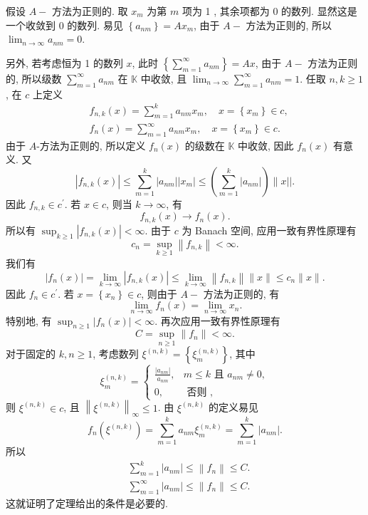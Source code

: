 \documentclass[openany]{ctexbook}
\makeatletter
\theoremstyle{kaiti}
\theoremstyle{normal}
\renewenvironment{proof}[1][\proofname]{\par
    \pushQED{\qed}%
    \normalfont \topsep6\p@\@plus6\p@\relax
    \trivlist
    \item\relax
    {\heiti #1}\hspace{2\labelsep}\ignorespaces
  }{%
    \popQED\endtrivlist\@endpefalse
  }
\makeatother
\begin{document}
\begin{proof}
假设 $A-$ 方法为正则的. 取 $x_m$ 为第 $m$ 项为 1 , 其余项都为 0 的数列. 显然这是一个收敛到 0 的数列. 易见 $\left\{a_{n m}\right\}=A x_m$, 由于 $A-$ 方法为正则的, 所以 $\lim_{n \rightarrow \infty} a_{n m}=0$.

另外, 若考虑恒为 1 的数列 $x$, 此时 $\left\{\sum_{m=1}^{\infty} a_{n m}\right\}=A x$, 由于 $A-$ 方法为正则的, 所以级数 $\sum_{m=1}^{\infty} a_{n m}$ 在 $\mathbb{K}$ 中收敛, 且 $\lim_{n \rightarrow \infty} \sum_{m=1}^{\infty} a_{n m}=1$.
任取 $n, k \geqslant 1$, 在 $c$ 上定义
$$
\begin{aligned}
&f_{n, k}(x)=\sum_{m=1}^{k} a_{n m} x_m, \quad x=\left\{x_m\right\} \in c, \\
&f_n(x)=\sum_{m=1}^{\infty} a_{n m} x_m, \quad x=\left\{x_m\right\} \in c.
\end{aligned}
$$
由于 $A$-方法为正则的, 所以定义 $f_n(x)$ 的级数在 $\mathbb{K}$ 中收敛, 因此 $f_n(x)$ 有意义. 又
$$
\left|f_{n, k}(x)\right| \leqslant \sum_{m=1}^{k}\left|a_{n m}\right|\left|x_m\right| \leqslant\left(\sum_{m=1}^{k}\left|a_{n m}\right|\right) \| x||.
$$
因此 $f_{n, k} \in c^{\prime}$. 若 $x \in c$, 则当 $k \rightarrow \infty$, 有
$$
f_{n, k}(x) \rightarrow f_n(x).
$$
所以有 $\sup_{k \geqslant 1}\left|f_{n, k}(x)\right|<\infty$. 由于 $c$ 为 Banach 空间, 应用一致有界性原理有
$$
c_n=\sup_{k \geqslant 1}\left\|f_{n, k}\right\|<\infty.
$$
我们有
$$
\left|f_n(x)\right|=\lim_{k \rightarrow \infty}\left|f_{n, k}(x)\right| \leqslant \lim_{k \rightarrow \infty}\left\|f_{n, k}\right\|\|x\| \leqslant c_n\|x\|.
$$
因此 $f_n \in c^{\prime}$. 若 $x=\left\{x_n\right\} \in c$, 则由于 $A-$ 方法为正则的, 有
$$
\lim_{n \rightarrow \infty} f_n(x)=\lim_{n \rightarrow \infty} x_n.
$$
特别地, 有 $\sup_{n \geqslant 1}\left|f_n(x)\right|<\infty$. 再次应用一致有界性原理有
$$
C=\sup_{n \geqslant 1}\left\|f_n\right\|<\infty.
$$
对于固定的 $k, n \geqslant 1$, 考虑数列 $\xi^{(n, k)}=\left\{\xi_m^{(n, k)}\right\}$, 其中
$$
\xi_m^{(n, k)}= \begin{cases}\frac{\left|a_{n m}\right|}{a_{n m}}, & m \leqslant k \text { 且 } a_{n m} \neq 0, \\ 0, & \text { 否则 },\end{cases}
$$
则 $\xi^{(n, k)} \in c$, 且 $\left\|\xi^{(n, k)}\right\|_{\infty} \leqslant 1$. 由 $\xi^{(n, k)}$ 的定义易见
$$
f_n\left(\xi^{(n, k)}\right)=\sum_{m=1}^{k} a_{n m} \xi_m^{(n, k)}=\sum_{m=1}^{k}\left|a_{n m}\right|.
$$
所以
$$
\begin{aligned}
&\sum_{m=1}^{k}\left|a_{n m}\right| \leqslant\left\|f_n\right\| \leqslant C. \\
&\sum_{m=1}^{\infty}\left|a_{n m}\right| \leqslant\left\|f_n\right\| \leqslant C.
\end{aligned}
$$
这就证明了定理给出的条件是必要的.


\end{proof}
\end{document}
